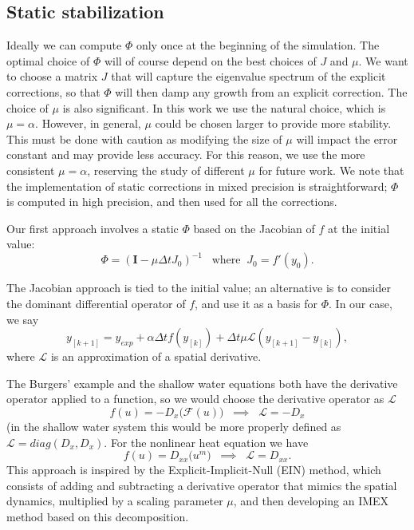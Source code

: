 \documentclass{siamart251104}
\newcommand{\dt}{\Delta t}
\newcommand{\m}[1]{\mathbf{#1}}
\newcommand{\mI}{\m{I}}
\begin{document}
\subsection{Static stabilization}
Ideally we can compute  $\Phi$ only once at the beginning of the 
simulation. The optimal choice of $\Phi$ will of course depend on the
best choices of $J$ and $\mu$.  We want to choose a matrix $J$
that will capture the eigenvalue spectrum of the explicit corrections,
so that $\Phi$ will then damp any growth from an explicit correction.
The choice of $\mu$ is also significant. 
In this work we use the natural choice, which  is $\mu = \alpha$.
However, in general, $\mu$ could be chosen larger to provide more stability.
This must be done with caution as modifying the size of $\mu$ will impact the error constant
and may provide less accuracy. For this reason, we use the more consistent $\mu = \alpha$,
reserving the study of different $\mu$ for future work.
We note that the implementation of static corrections
in mixed precision is straightforward;
$\Phi$ is computed in high precision, and then used for 
all the corrections. 


Our first approach involves a  static $\Phi$ based on the Jacobian 
of $f$ at the initial value:
\[ \Phi = \left(\mI - \mu \dt J_0 \right)^{-1} 
\; \; \; \mbox{where} \; \;  J_0 = f'(y_0). \] 


\smallskip

The Jacobian approach is tied to the initial value; an alternative
is to consider the dominant differential operator of $f$, 
and use it as a basis for $\Phi$.
In our case, we say
\[ y_{[k+1]} = y_{exp} + \alpha \dt f(y_{[k]}) + \dt \mu \mathcal{L} 
(y_{[k+1]} - y_{[k]}),\]
where $\mathcal{L}$ is an approximation of a spatial derivative.

The Burgers' example and the shallow water equations
both have the derivative operator applied to a function, so 
we would choose the derivative operator as $\mathcal{L}$
\[ f(u) = - D_x \big(\mathcal{F}(u) \big)  \; \;  
\implies \; \;  \mathcal{L} = - D_x \] 
(in the shallow water system this would be more properly defined as $\mathcal{L} = diag(D_x,D_x)$. 
For the nonlinear heat equation we have
\[ f(u) = D_{xx} \big(u^m \big)  \; \;  
\implies \; \;  \mathcal{L} = D_{xx} .\] 
This approach is inspired by the Explicit-Implicit-Null (EIN) 
method, which consists of adding and subtracting a derivative operator that mimics the spatial dynamics, multiplied by a scaling parameter $\mu$,
and then developing an IMEX method based on this decomposition.
\end{document}
